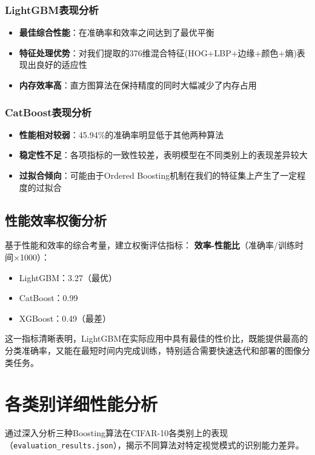 \documentclass[UTF8]{report}
\theoremstyle{MyLineTheoremStyle} %
\theoremstyle{MyBlockTheoremStyle} %
\theoremstyle{MySubsubsectionStyle} %
\begin{document}
\subsubsection{LightGBM表现分析}
\begin{itemize}
    \item \textbf{最佳综合性能}：在准确率和效率之间达到了最优平衡
    \item \textbf{特征处理优势}：对我们提取的376维混合特征(HOG+LBP+边缘+颜色+熵)表现出良好的适应性
    \item \textbf{内存效率高}：直方图算法在保持精度的同时大幅减少了内存占用
\end{itemize}

\subsubsection{CatBoost表现分析}
\begin{itemize}
    \item \textbf{性能相对较弱}：45.94\%的准确率明显低于其他两种算法
    \item \textbf{稳定性不足}：各项指标的一致性较差，表明模型在不同类别上的表现差异较大
    \item \textbf{过拟合倾向}：可能由于Ordered Boosting机制在我们的特征集上产生了一定程度的过拟合
\end{itemize}

\subsection{性能效率权衡分析}
基于性能和效率的综合考量，建立权衡评估指标：
\textbf{效率-性能比}（准确率/训练时间×1000）：
\begin{itemize}
    \item LightGBM：3.27（最优）
    \item CatBoost：0.99
    \item XGBoost：0.49（最差）
\end{itemize}
这一指标清晰表明，LightGBM在实际应用中具有最佳的性价比，既能提供最高的分类准确率，又能在最短时间内完成训练，特别适合需要快速迭代和部署的图像分类任务。

\section{各类别详细性能分析}
通过深入分析三种Boosting算法在CIFAR-10各类别上的表现（\texttt{evaluation\_results.json}），揭示不同算法对特定视觉模式的识别能力差异。
\end{document}

